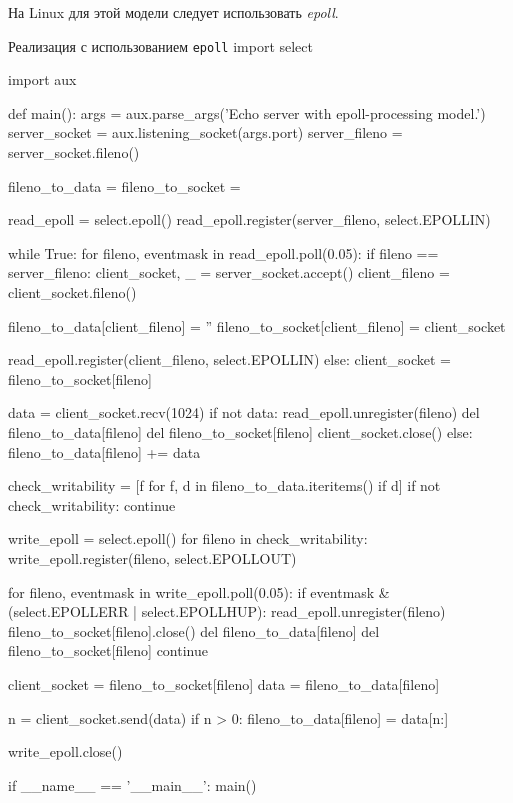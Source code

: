 На Linux для этой модели следует использовать \emph{epoll}.

\begin{pylst}{Реализация с использованием \lstinline{epoll}}{}
import select

import aux

def main():
    args = aux.parse_args('Echo server with epoll-processing model.')
    server_socket = aux.listening_socket(args.port)
    server_fileno = server_socket.fileno()

    fileno_to_data = {}
    fileno_to_socket = {}

    read_epoll = select.epoll()
    read_epoll.register(server_fileno, select.EPOLLIN)

    while True:
        for fileno, eventmask in read_epoll.poll(0.05):
            if fileno == server_fileno:
                client_socket, _ = server_socket.accept()
                client_fileno = client_socket.fileno()

                fileno_to_data[client_fileno] = ''
                fileno_to_socket[client_fileno] = client_socket

                read_epoll.register(client_fileno, select.EPOLLIN)
            else:
                client_socket = fileno_to_socket[fileno]

                data = client_socket.recv(1024)
                if not data:
                    read_epoll.unregister(fileno)
                    del fileno_to_data[fileno]
                    del fileno_to_socket[fileno]
                    client_socket.close()
                else:
                    fileno_to_data[fileno] += data

        check_writability = [f for f, d in fileno_to_data.iteritems() if d]
        if not check_writability:
            continue

        write_epoll = select.epoll()
        for fileno in check_writability:
            write_epoll.register(fileno, select.EPOLLOUT)

        for fileno, eventmask in write_epoll.poll(0.05):
            if eventmask & (select.EPOLLERR | select.EPOLLHUP):
                read_epoll.unregister(fileno)
                fileno_to_socket[fileno].close()
                del fileno_to_data[fileno]
                del fileno_to_socket[fileno]
                continue

            client_socket = fileno_to_socket[fileno]
            data = fileno_to_data[fileno]

            n = client_socket.send(data)
            if n > 0:
                fileno_to_data[fileno] = data[n:]

        write_epoll.close()

if __name__ == '__main__':
    main()
\end{pylst}

